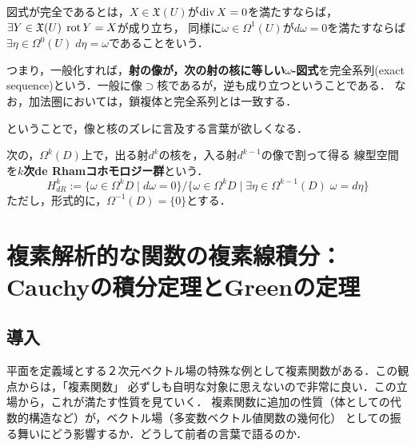 \documentclass[uplatex, dvipdfmx]{jsreport}
\begin{document}
\begin{definition}[図式が完全]
    図式が完全であるとは，$X\in\mathfrak{X}(U)$が$\operatorname{\mathrm{div}} X=0$を満たすならば，$\exists Y\in\mathfrak{X}(U)\;\operatorname{\mathrm{rot}} Y=X$が成り立ち，
    同様に$\omega\in\Omega^1(U)$が$d\omega=0$を満たすならば$\exists\eta\in\Omega^0(U)\;d\eta=\omega$であることをいう．

    つまり，一般化すれば，\textbf{射の像が，次の射の核に等しい$\omega$-図式}を完全系列(exact sequence)という．一般に像$\supset$核であるが，逆も成り立つということである．
    なお，加法圏においては，鎖複体と完全系列とは一致する．
    \begin{center}
    \end{center}
\end{definition}
ということで，像と核のズレに言及する言葉が欲しくなる．
\begin{definition}
    次の，$\Omega^k(D)$上で，出る射$d^k$の核を，入る射$d^{k-1}$の像で割って得る
    線型空間を\textbf{$k$次de Rhamコホモロジー群}という．
    \[ H^k_{dR}:=\{ \omega\in\Omega^k{D}\mid d\omega=0 \} / \{ \omega\in\Omega^k{D}\mid \exists\eta\in\Omega^{k-1}(D)\;\omega=d\eta \} \]
    ただし，形式的に，$\Omega^{-1}(D)=\{0\}$とする．
\end{definition}

\section{複素解析的な関数の複素線積分：Cauchyの積分定理とGreenの定理}

\subsection{導入}

平面を定義域とする２次元ベクトル場の特殊な例として複素関数がある．この観点からは，「複素関数」
必ずしも自明な対象に思えないので非常に良い．この立場から，これが満たす性質を見ていく．
複素関数に追加の性質（体としての代数的構造など）が，ベクトル場（多変数ベクトル値関数の幾何化）
としての振る舞いにどう影響するか．どうして前者の言葉で語るのか．
\end{document}
